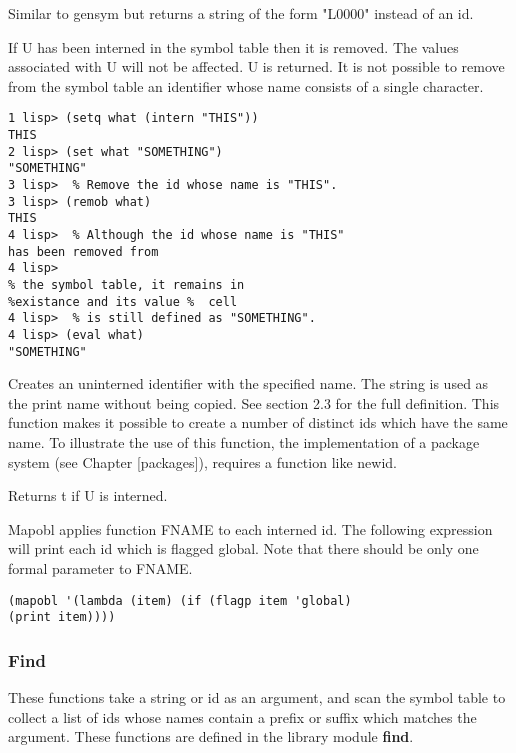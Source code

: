 {    Similar to gensym but returns a string of the  form  "L0000"
    instead of an id.
}

{    If  U  has  been  interned  in  the  symbol table then it is
    removed.  The values associated with U will not be affected.
    U is returned.  It is not possible to remove from the symbol
    table  an  identifier  whose  name  consists  of  a   single
    character.
}
\begin{verbatim}
1 lisp> (setq what (intern "THIS"))
THIS
2 lisp> (set what "SOMETHING")
"SOMETHING"
3 lisp>  % Remove the id whose name is "THIS".
3 lisp> (remob what)
THIS
4 lisp>  % Although the id whose name is "THIS"
has been removed from
4 lisp>  
% the symbol table, it remains in 
%existance and its value %	cell
4 lisp>  % is still defined as "SOMETHING".
4 lisp> (eval what)
"SOMETHING"
\end{verbatim}

{    Creates  an  uninterned  identifier with the specified name.
    The string is used as the print name without  being  copied.
    See  section  2.3  for  the  full definition.  This function
    makes it possible to create a number of distinct  ids  which
    have the same name.  To illustrate the use of this function,
    the   implementation   of  a  package  system  (see  Chapter
    [packages]), requires a function like newid.
}

{    Returns t if U is interned.
}

{    Mapobl applies function FNAME to  each  interned  id.    The
    following  expression  will  print  each id which is flagged
    global.  Note that there should be only one formal parameter
    to FNAME.
}
\begin{verbatim}
(mapobl '(lambda (item) (if (flagp item 'global)
(print item))))
\end{verbatim}
\subsubsection{Find}

These functions take a string or id as an argument,  and  scan
the  symbol table to collect a list of ids whose names contain a
prefix or suffix which matches the argument.    These  functions
are defined in the library module {\bf find}.


